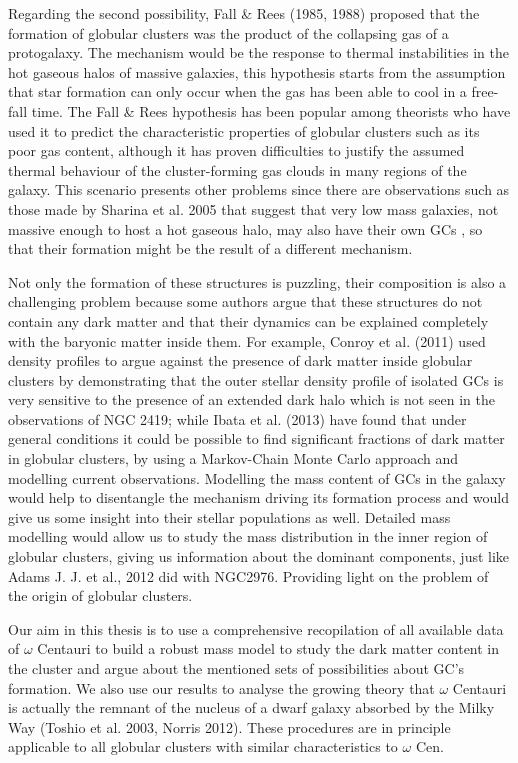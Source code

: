 Regarding the second possibility, Fall \& Rees (1985, 1988) proposed that the formation of globular clusters was the product of the collapsing gas of a protogalaxy. The mechanism would be the response to thermal instabilities in the hot gaseous halos of massive galaxies, this hypothesis starts from the assumption that star formation can only occur when the gas has been able to cool in a free-fall time. The Fall \& Rees hypothesis has been popular among theorists who have used it to predict the characteristic properties of globular clusters such as its poor gas content, although it has proven difficulties to justify the assumed thermal behaviour of the cluster-forming gas clouds in many regions of the galaxy. This scenario presents other problems since there are observations such as those made by Sharina et al. 2005 that suggest that very low mass galaxies, not massive enough to host a hot gaseous halo, may also have their own GCs , so that their formation might be the result of a different mechanism.

Not only the formation of these structures is puzzling, their composition is also a challenging problem because some authors argue that these structures do not contain any dark matter and that their dynamics can be explained completely with the baryonic matter inside them. For example, Conroy et al. (2011) used density profiles to argue against the presence of dark matter inside globular clusters by demonstrating that the outer stellar density profile of isolated GCs is
very sensitive to the presence of an extended dark halo which is not seen in the observations of NGC 2419; while Ibata et al. (2013) have found that under general conditions it could be possible to find significant fractions of dark matter in globular clusters, by using a Markov-Chain Monte Carlo approach and modelling current observations. Modelling the mass content of GCs in the galaxy would help to disentangle the mechanism driving its formation process and would give us some insight into their stellar populations as well. Detailed mass modelling would allow us to study the mass distribution in the inner region of globular clusters, giving us information about the dominant components, just like Adams J. J. et al., 2012 did with NGC2976. Providing light on the problem of the origin of globular clusters.

Our aim in this thesis is to use a comprehensive recopilation of all available data of $\omega$ Centauri to build a robust mass model to study the dark matter content in the cluster and argue about the mentioned sets of possibilities about GC's formation. We also use our results to analyse the growing theory that $\omega$ Centauri is actually the remnant of the nucleus of a dwarf galaxy absorbed by the Milky Way (Toshio et al. 2003, Norris 2012). These procedures are in principle applicable to all globular clusters with similar characteristics to $\omega$ Cen. 

